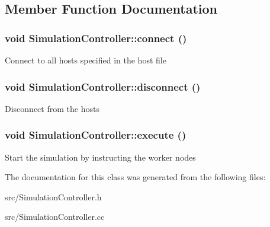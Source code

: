 \subsection{Member Function Documentation}
\hypertarget{classSimulationController_a37b7e33fd9ea6d3505cc8ae1dbbbf284}{
\subsubsection[{connect}]{\setlength{\rightskip}{0pt plus 5cm}void SimulationController::connect ()}}
\label{classSimulationController_a37b7e33fd9ea6d3505cc8ae1dbbbf284}
Connect to all hosts specified in the host file \hypertarget{classSimulationController_a269e17c70a9661843bbd536d62dc771f}{
\subsubsection[{disconnect}]{\setlength{\rightskip}{0pt plus 5cm}void SimulationController::disconnect ()}}
\label{classSimulationController_a269e17c70a9661843bbd536d62dc771f}
Disconnect from the hosts \hypertarget{classSimulationController_a5b756fb934ac05829b28e46a85a6497d}{
\subsubsection[{execute}]{\setlength{\rightskip}{0pt plus 5cm}void SimulationController::execute ()}}
\label{classSimulationController_a5b756fb934ac05829b28e46a85a6497d}
Start the simulation by instructing the worker nodes 

The documentation for this class was generated from the following files:\begin{DoxyCompactItemize}
\item 
src/SimulationController.h\item 
src/SimulationController.cc\end{DoxyCompactItemize}

